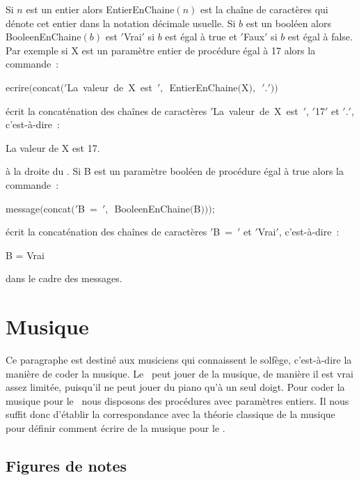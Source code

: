 Si $n$ est un entier alors {\idt EntierEnChaine$(n)$} est la chaîne de caractères qui dénote cet entier dans la notation
décimale usuelle. Si $b$ est un booléen alors  {\idt BooleenEnChaine$(b)$} est 
{\cha $\scriptstyle '$Vrai\idt $\scriptstyle '$}
si $b$ est égal à {\idt true} et
{\cha $\scriptstyle '$Faux\idt $\scriptstyle '$}
si $b$ est égal à {\idt false}.  
Par exemple si {\idt X} est un paramètre entier de procédure égal à 17 alors la
commande~:
\begin{center}
{\idt  ecrire$($concat$($\cha $\scriptstyle '$La\ valeur\ de\ X\ est\ \idt $\scriptstyle ',$\ EntierEnChaine$($X$),$\ \cha $\scriptstyle '$.\idt $\scriptstyle '))$}
\end{center}
\' ecrit la concaténation des chaînes  de caractères
{\cha $\scriptstyle '$La\ valeur\ de\ X\ est\ $\scriptstyle '$},
{\cha $\scriptstyle '$17$\scriptstyle '$}
et {\cha $\scriptstyle '$.$\scriptstyle '$}, c'est-à-dire~:
\begin{center}
{\idt La valeur de X est 17.}
\end{center}
à la droite du \robot. 
Si {\idt B} est un paramètre booléen de procédure égal à {\idt true} alors la
commande~:
\begin{center}
{\idt  message$($concat$($\cha $\scriptstyle '$B\ =\ \idt $\scriptstyle ',$\ BooleenEnChaine$($B$)));$}
\end{center}
écrit la concaténation des chaînes  de caractères
{\cha $\scriptstyle '$B\ =\ $\scriptstyle '$}
et {\cha $\scriptstyle '$Vrai$\scriptstyle '$}, c'est-à-dire~:
\begin{center}
{\idt B = Vrai}
\end{center}
dans le cadre des messages.



\section{Musique}

Ce paragraphe est destiné aux musiciens qui connaissent le solfège, c'est-à-dire la manière 
de coder la musique.  Le \robot\ peut jouer de la musique, de 
manière il est vrai assez limitée, puisqu'il ne peut jouer du piano qu'à un seul doigt. Pour
coder la musique pour le \robot\ nous disposons des procédures avec paramètres entiers. Il
nous suffit donc d'établir la correspondance avec la théorie classique de la musique
\cite{solfege} pour définir comment écrire de la musique pour le \robot.

\subsection{Figures de notes}

